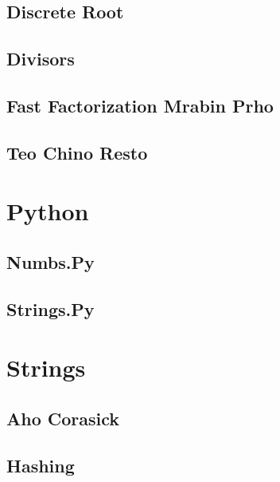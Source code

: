 \documentclass[10pt,portrait,twocolumn,a4paper,notitlepage]{article}
\newcommand\cppfile[2][]{%
\ifstrempty{#1}{}{}%
}
\newcommand\pythonfile[2][]{%
\ifstrempty{#1}{}{}%
}
\begin{document}
\subsection{Discrete Root}
\cppfile{number_theory_clean/discrete_root.cpp}

\subsection{Divisors}
\cppfile{number_theory_clean/divisors.cpp}

\subsection{Fast Factorization Mrabin Prho}
\cppfile{number_theory_clean/fast_factorization_mrabin_prho.cpp}

\subsection{Teo Chino Resto}
\cppfile{number_theory_clean/teo_chino_resto.cpp}


\section{Python}

\subsection{Numbs.Py}
\pythonfile{Python_clean/numbs.py}

\subsection{Strings.Py}
\pythonfile{Python_clean/strings.py}


\section{Strings}

\subsection{Aho Corasick}
\cppfile{strings_clean/aho_corasick.cpp}

\subsection{Hashing}
\cppfile{strings_clean/hashing.cpp}
\end{document}
